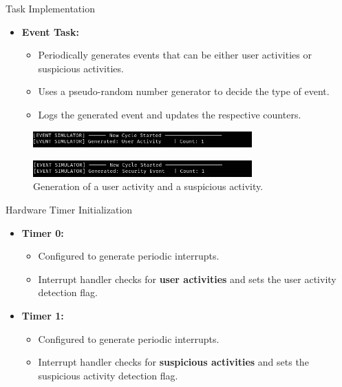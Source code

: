 \begin{frame}{Task Implementation}
    \begin{itemize}
        \item \textbf{Event Task:}
            \begin{itemize}
                \item Periodically generates events that can be either user activities or suspicious activities.
                \item Uses a pseudo-random number generator to decide the type of event.
                \item Logs the generated event and updates the respective counters.
            \end{itemize}
    \end{itemize}
    \begin{figure}[h]
        \centering
        \includegraphics[width=0.75\textwidth]{images/event_task_1.png}
    \end{figure}
    \begin{figure}[h]
        \centering
        \includegraphics[width=0.75\textwidth]{images/event_task_2.png}
        \caption{Generation of a user activity and a suspicious activity.}
    \end{figure}
\end{frame}

\begin{frame}{Hardware Timer Initialization}
    \begin{itemize}
        \item \textbf{Timer 0:}
            \begin{itemize}
                \item Configured to generate periodic interrupts.
                \item Interrupt handler checks for \textbf{user activities} and sets the user activity detection flag.
            \end{itemize}
        \item \textbf{Timer 1:}
            \begin{itemize}
                \item Configured to generate periodic interrupts.
                \item Interrupt handler checks for \textbf{suspicious activities} and sets the suspicious activity detection flag.
            \end{itemize}
    \end{itemize}
\end{frame}

